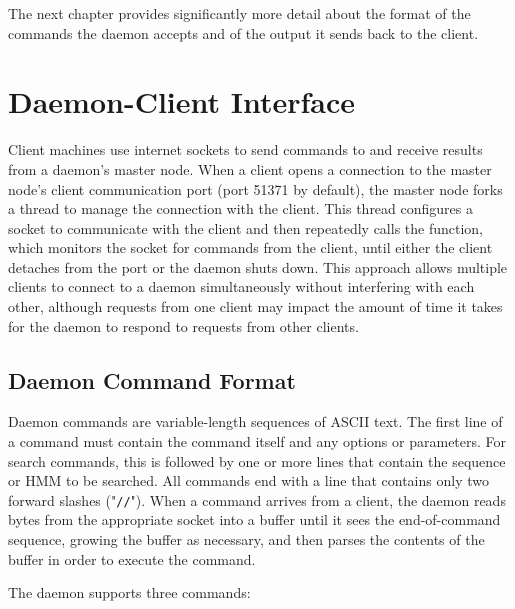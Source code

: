 \documentclass[notoc,justified]{tufte-book}    %
\begin{document}
 The next chapter provides significantly more detail about the format of the commands the daemon accepts and of the output it sends back to the client.

\chapter{Daemon-Client Interface}
Client machines use internet sockets to send commands to and receive results from a daemon's master node.  When a client opens a connection to the master node's client communication port (port 51371 by default), the master node forks a thread to manage the connection with the client.  This thread configures a socket to communicate with the client and then repeatedly calls the  function, which monitors the socket for commands from the client, until either the client detaches from the port or the daemon shuts down.  This approach allows multiple clients to connect to a daemon simultaneously without interfering with each other, although requests from one client may impact the amount of time it takes for the daemon to respond to requests from other clients.


\section{Daemon Command Format}
Daemon commands are variable-length sequences of ASCII text.  The first line of a command must contain the command itself and any options or parameters.  For search commands, this is followed by one or more lines that contain the sequence or HMM to be searched.  All commands end with a line that contains only two forward slashes ("{\tt //}").  When a command arrives from a client, the daemon reads bytes from the appropriate socket into a buffer until it sees the end-of-command sequence, growing the buffer as necessary, and then parses the contents of the buffer in order to execute the command.   

The daemon supports three commands:
\end{document}
